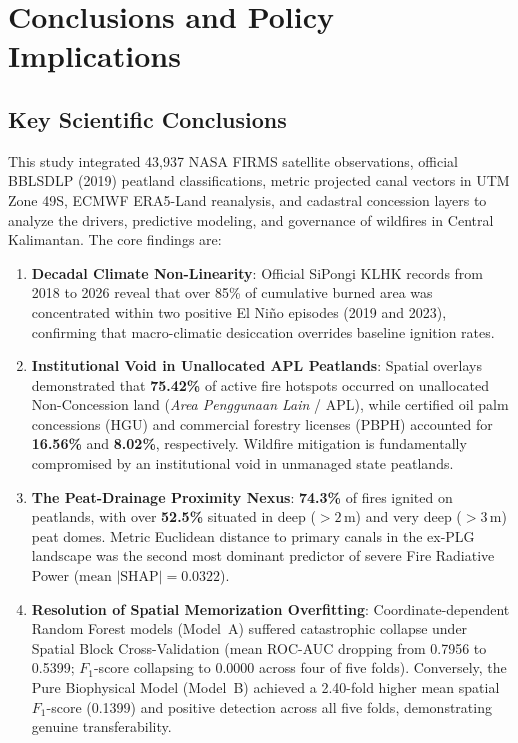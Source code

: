 \section{Conclusions and Policy Implications}
\label{sec:conclusions}

\subsection{Key Scientific Conclusions}
\label{subsec:concl_scientific}

This study integrated 43,937 NASA FIRMS satellite observations, official BBLSDLP (2019) peatland classifications, metric projected canal vectors in UTM Zone 49S, ECMWF ERA5-Land reanalysis, and cadastral concession layers to analyze the drivers, predictive modeling, and governance of wildfires in Central Kalimantan. The core findings are:
\begin{enumerate}
    \item \textbf{Decadal Climate Non-Linearity}: Official SiPongi KLHK records from 2018 to 2026 reveal that over 85\% of cumulative burned area was concentrated within two positive El Ni\~no episodes (2019 and 2023), confirming that macro-climatic desiccation overrides baseline ignition rates.
    \item \textbf{Institutional Void in Unallocated APL Peatlands}: Spatial overlays demonstrated that \textbf{75.42\%} of active fire hotspots occurred on unallocated Non-Concession land (\textit{Area Penggunaan Lain} / APL), while certified oil palm concessions (HGU) and commercial forestry licenses (PBPH) accounted for \textbf{16.56\%} and \textbf{8.02\%}, respectively. Wildfire mitigation is fundamentally compromised by an institutional void in unmanaged state peatlands.
    \item \textbf{The Peat-Drainage Proximity Nexus}: \textbf{74.3\%} of fires ignited on peatlands, with over \textbf{52.5\%} situated in deep ($>2$\,m) and very deep ($>3$\,m) peat domes. Metric Euclidean distance to primary canals in the ex-PLG landscape was the second most dominant predictor of severe Fire Radiative Power ($\text{mean } |\text{SHAP}| = 0.0322$).
    \item \textbf{Resolution of Spatial Memorization Overfitting}: Coordinate-dependent Random Forest models (Model~A) suffered catastrophic collapse under Spatial Block Cross-Validation (mean ROC-AUC dropping from 0.7956 to 0.5399; $F_1$-score collapsing to 0.0000 across four of five folds). Conversely, the Pure Biophysical Model (Model~B) achieved a 2.40-fold higher mean spatial $F_1$-score (0.1399) and positive detection across all five folds, demonstrating genuine transferability.
\end{enumerate}

